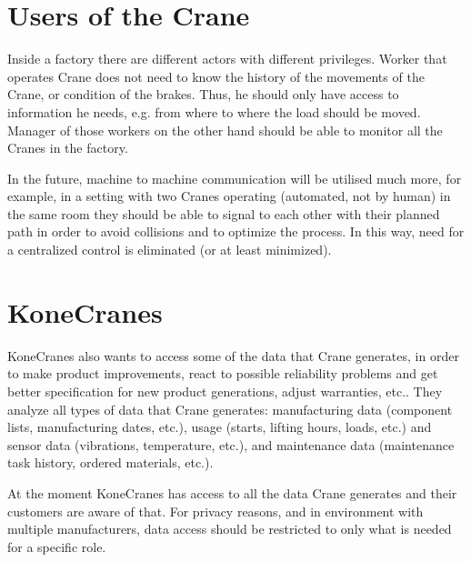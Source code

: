 \section*{Users of the Crane}

Inside a factory there are different actors with different privileges. Worker that
operates Crane does not need to know the history of the movements of the Crane, or 
condition of the brakes. Thus, he should only have access to information he needs, e.g. 
from where to where the load should be moved.
Manager of those workers on the other hand should be able to monitor all the Cranes in
the factory.

In the future, machine to machine communication will be utilised much more, for example, 
in a setting with two Cranes operating (automated, not by human) in the same room they 
should be able to signal to each other with their planned path in order to avoid collisions
and to optimize the process. In this way, need for a centralized control is eliminated (or at
least minimized).

\section*{KoneCranes}

KoneCranes also wants to access some of the data that Crane generates, in order to make product improvements, react to possible reliability problems and get better specification for new product generations, adjust warranties, etc..
They analyze all types of data that Crane generates: manufacturing data (component lists, manufacturing dates, etc.), usage (starts, lifting hours, loads, etc.) and sensor data (vibrations, temperature, etc.), and maintenance data (maintenance task history, ordered materials, etc.).

At the moment KoneCranes has access to all the data Crane generates and their customers are aware
of that. For privacy reasons, and in environment with multiple manufacturers, data access should be restricted to only what is needed for a specific role. 
